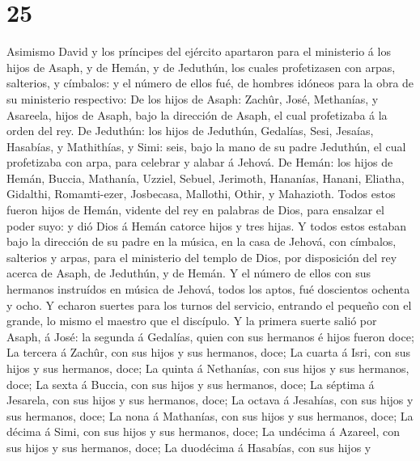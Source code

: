 \hypertarget{section-24}{%
\section{25}\label{section-24}}

 Asimismo David y los príncipes del ejército apartaron
para el ministerio á los hijos de Asaph, y de Hemán, y de Jeduthún, los
cuales profetizasen con arpas, salterios, y címbalos: y el número de
ellos fué, de hombres idóneos para la obra de su ministerio respectivo:
 De los hijos de Asaph: Zachûr, José, Methanías, y
Asareela, hijos de Asaph, bajo la dirección de Asaph, el cual
profetizaba á la orden del rey.  De Jeduthún: los hijos de
Jeduthún, Gedalías, Sesi, Jesaías, Hasabías, y Mathithías, y Simi: seis,
bajo la mano de su padre Jeduthún, el cual profetizaba con arpa, para
celebrar y alabar á Jehová.  De Hemán: los hijos de Hemán,
Buccia, Mathanía, Uzziel, Sebuel, Jerimoth, Hananías, Hanani, Eliatha,
Gidalthi, Romamti-ezer, Josbecasa, Mallothi, Othir, y Mahazioth.
 Todos estos fueron hijos de Hemán, vidente del rey en
palabras de Dios, para ensalzar el poder suyo: y dió Dios á Hemán
catorce hijos y tres hijas.  Y todos estos estaban bajo la
dirección de su padre en la música, en la casa de Jehová, con címbalos,
salterios y arpas, para el ministerio del templo de Dios, por
disposición del rey acerca de Asaph, de Jeduthún, y de Hemán.
 Y el número de ellos con sus hermanos instruídos en
música de Jehová, todos los aptos, fué doscientos ochenta y ocho.
 Y echaron suertes para los turnos del servicio, entrando
el pequeño con el grande, lo mismo el maestro que el discípulo.
 Y la primera suerte salió por Asaph, á José: la segunda á
Gedalías, quien con sus hermanos é hijos fueron doce;  La
tercera á Zachûr, con sus hijos y sus hermanos, doce;  La
cuarta á Isri, con sus hijos y sus hermanos, doce;  La
quinta á Nethanías, con sus hijos y sus hermanos, doce; 
La sexta á Buccia, con sus hijos y sus hermanos, doce; 
La séptima á Jesarela, con sus hijos y sus hermanos, doce;
 La octava á Jesahías, con sus hijos y sus hermanos,
doce;  La nona á Mathanías, con sus hijos y sus hermanos,
doce;  La décima á Simi, con sus hijos y sus hermanos,
doce;  La undécima á Azareel, con sus hijos y sus
hermanos, doce;  La duodécima á Hasabías, con sus hijos y
